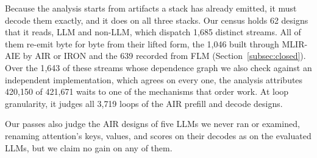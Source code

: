 Because the analysis starts from artifacts a stack has already emitted, it must decode them exactly, and it does on all three stacks.
Our census holds 62 designs that it reads, LLM and non-LLM, which dispatch 1{,}685 distinct streams.
All of them re-emit byte for byte from their lifted form, the 1{,}046 built through MLIR-AIE by AIR or IRON and the 639 recorded from FLM (Section~\ref{subsec:closed}).
Over the 1{,}643 of these streams whose dependence graph we also check against an independent implementation, which agrees on every one, the analysis attributes 420{,}150 of 421{,}671 waits to one of the mechanisms that order work.
At loop granularity, it judges all 3{,}719 loops of the AIR prefill and decode designs.

Our passes also judge the AIR designs of five LLMs we never ran or examined, renaming attention's keys, values, and scores on their decodes as on the evaluated LLMs, but we claim no gain on any of them.

